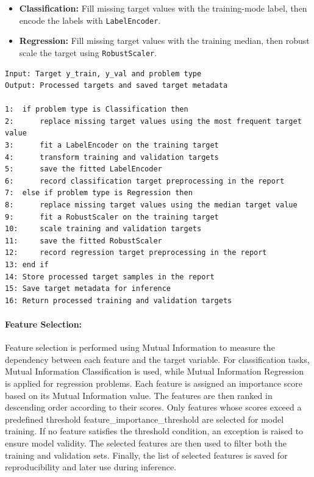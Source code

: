 \begin{itemize}
  \item \textbf{Classification:} Fill missing target values with the training-mode label, then encode the labels with \texttt{LabelEncoder}.
  \item \textbf{Regression:} Fill missing target values with the training median, then robust scale the target using \texttt{RobustScaler}. 
\end{itemize}
\begin{lstlisting}[style=algostyle,caption={Target Variable Preprocessing}]
Input: Target y_train, y_val and problem type
Output: Processed targets and saved target metadata

1:  if problem type is Classification then
2:      replace missing target values using the most frequent target value
3:      fit a LabelEncoder on the training target
4:      transform training and validation targets
5:      save the fitted LabelEncoder
6:      record classification target preprocessing in the report
7:  else if problem type is Regression then
8:      replace missing target values using the median target value
9:      fit a RobustScaler on the training target
10:     scale training and validation targets
11:     save the fitted RobustScaler
12:     record regression target preprocessing in the report
13: end if
14: Store processed target samples in the report
15: Save target metadata for inference
16: Return processed training and validation targets
\end{lstlisting}

\vspace{1cm}
\paragraph{Feature Selection:}\par
Feature selection is performed using Mutual Information to measure the dependency between each feature and the target variable. 
For classification tasks, Mutual Information Classification is used, while Mutual Information Regression is applied for regression problems.
Each feature is assigned an importance score based on its Mutual Information value. 
The features are then ranked in descending order according to their scores. 
Only features whose scores exceed a predefined threshold feature\_importance\_threshold are selected for model training.
If no feature satisfies the threshold condition, an exception is raised to ensure model validity. 
The selected features are then used to filter both the training and validation sets. 
Finally, the list of selected features is saved for reproducibility and later use during inference.
\vspace{1cm}
